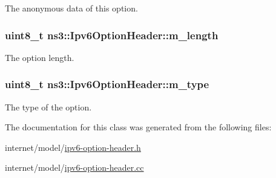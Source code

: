 The anonymous data of this option. 

\subsubsection[{\texorpdfstring{m\+\_\+length}{m_length}}]{\setlength{\rightskip}{0pt plus 5cm}uint8\+\_\+t ns3\+::\+Ipv6\+Option\+Header\+::m\+\_\+length\hspace{0.3cm}{\ttfamily [private]}}\hypertarget{classns3_1_1Ipv6OptionHeader_a4a10839124d8b4ecba959636a3c85c27}{}\label{classns3_1_1Ipv6OptionHeader_a4a10839124d8b4ecba959636a3c85c27}


The option length. 

\subsubsection[{\texorpdfstring{m\+\_\+type}{m_type}}]{\setlength{\rightskip}{0pt plus 5cm}uint8\+\_\+t ns3\+::\+Ipv6\+Option\+Header\+::m\+\_\+type\hspace{0.3cm}{\ttfamily [private]}}\hypertarget{classns3_1_1Ipv6OptionHeader_a189650d5494796ff239ae9fed8d86acf}{}\label{classns3_1_1Ipv6OptionHeader_a189650d5494796ff239ae9fed8d86acf}


The type of the option. 



The documentation for this class was generated from the following files\+:\begin{DoxyCompactItemize}
\item 
internet/model/\hyperlink{ipv6-option-header_8h}{ipv6-\/option-\/header.\+h}\item 
internet/model/\hyperlink{ipv6-option-header_8cc}{ipv6-\/option-\/header.\+cc}\end{DoxyCompactItemize}
